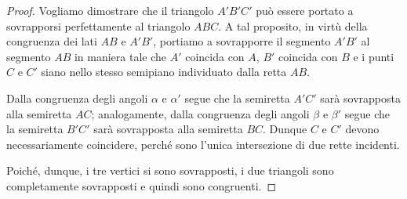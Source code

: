 \begin{proof}
Vogliamo dimostrare che il triangolo $A'B'C'$ può essere portato a sovrapporsi perfettamente al triangolo $ABC$.
A tal proposito, in virtù della congruenza dei lati $AB$ e $A'B'$, portiamo a sovrapporre il segmento $A'B'$ al segmento $AB$ in maniera tale che $A'$ coincida con $A$, $B'$ coincida con $B$ e i punti $C$ e $C'$ siano nello stesso semipiano individuato dalla retta $AB$. 

Dalla congruenza degli angoli $\alpha$ e $\alpha'$ segue che la semiretta $A'C'$ sarà sovrapposta alla semiretta $AC$; analogamente, dalla congruenza degli angoli $\beta$ e $\beta'$ segue che la semiretta $B'C'$ sarà sovrapposta alla semiretta $BC$. Dunque $C$ e $C'$ devono necessariamente coincidere, perché sono l'unica intersezione di due rette incidenti.

Poiché, dunque, i tre vertici si sono sovrapposti, i due triangoli sono completamente sovrapposti e quindi sono congruenti.
\end{proof}

